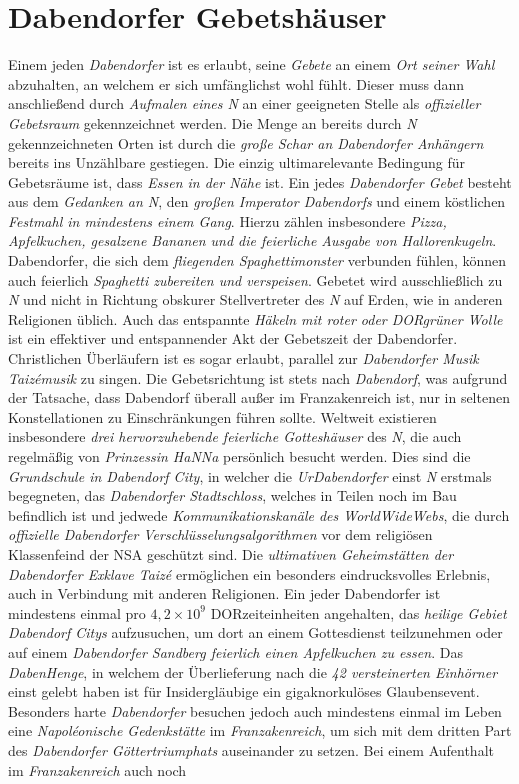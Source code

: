 \section{{Dabendorfer Gebetshäuser}}
Einem jeden \textit{Dabendorfer} ist es erlaubt, seine \textit{Gebete} an einem \textit{Ort seiner Wahl} abzuhalten, an welchem er sich umfänglichst wohl fühlt. Dieser muss dann anschließend durch \textit{Aufmalen eines N} an einer geeigneten Stelle als \textit{offizieller Gebetsraum} gekennzeichnet werden. Die Menge an bereits durch \textit{N} gekennzeichneten Orten ist durch die \textit{große Schar an Dabendorfer Anhängern} bereits ins Unzählbare gestiegen. Die einzig ultimarelevante Bedingung für Gebetsräume ist, dass \textit{Essen in der Nähe} ist. Ein jedes \textit{Dabendorfer Gebet} besteht aus dem \textit{Gedanken an N}, den \textit{großen Imperator Dabendorfs} und einem köstlichen \textit{Festmahl in mindestens einem Gang}. Hierzu zählen insbesondere \textit{Pizza, Apfelkuchen, gesalzene Bananen und die feierliche Ausgabe von Hallorenkugeln}. Dabendorfer, die sich dem \textit{fliegenden Spaghettimonster} verbunden fühlen, können auch feierlich \textit{Spaghetti zubereiten und verspeisen}. Gebetet wird ausschließlich zu \textit{N} und nicht in Richtung obskurer Stellvertreter des \textit{N} auf Erden, wie in anderen Religionen üblich. Auch das entspannte \textit{Häkeln mit roter oder DORgrüner Wolle} ist ein effektiver und entspannender Akt der Gebetszeit der Dabendorfer. Christlichen Überläufern ist es sogar erlaubt, parallel zur \textit{Dabendorfer Musik Taizémusik} zu singen. Die Gebetsrichtung ist stets nach \textit{Dabendorf}, was aufgrund der Tatsache, dass Dabendorf überall außer im Franzakenreich ist, nur in seltenen Konstellationen zu Einschränkungen führen sollte. Weltweit existieren insbesondere \textit{drei hervorzuhebende feierliche Gotteshäuser} des \textit{N}, die auch regelmäßig von \textit{Prinzessin HaNNa} persönlich besucht werden. Dies sind die \textit{Grundschule in Dabendorf City}, in welcher die \textit{UrDabendorfer} einst \textit{N} erstmals begegneten, das \textit{Dabendorfer Stadtschloss}, welches in Teilen noch im Bau befindlich ist und jedwede \textit{Kommunikationskanäle des WorldWideWebs}, die durch \textit{offizielle Dabendorfer Verschlüsselungsalgorithmen} vor dem religiösen Klassenfeind der NSA geschützt sind. Die \textit{ultimativen Geheimstätten der Dabendorfer Exklave Taizé} ermöglichen ein besonders eindrucksvolles Erlebnis, auch in Verbindung mit anderen Religionen. Ein jeder Dabendorfer ist mindestens einmal pro $4,2 \times10^9$ DORzeiteinheiten angehalten, das \textit{heilige Gebiet Dabendorf Citys} aufzusuchen, um dort an einem Gottesdienst teilzunehmen oder auf einem \textit{Dabendorfer Sandberg feierlich einen Apfelkuchen zu essen}. Das \textit{DabenHenge}, in welchem der Überlieferung nach die \textit{42 versteinerten Einhörner} einst gelebt haben ist für Insidergläubige ein gigaknorkulöses Glaubensevent. Besonders harte \textit{Dabendorfer} besuchen jedoch auch mindestens einmal im Leben eine \textit{Napoléonische Gedenkstätte} im \textit{Franzakenreich}, um sich mit dem dritten Part des \textit{Dabendorfer Göttertriumphats} auseinander zu setzen. Bei einem Aufenthalt im \textit{Franzakenreich} auch noch 